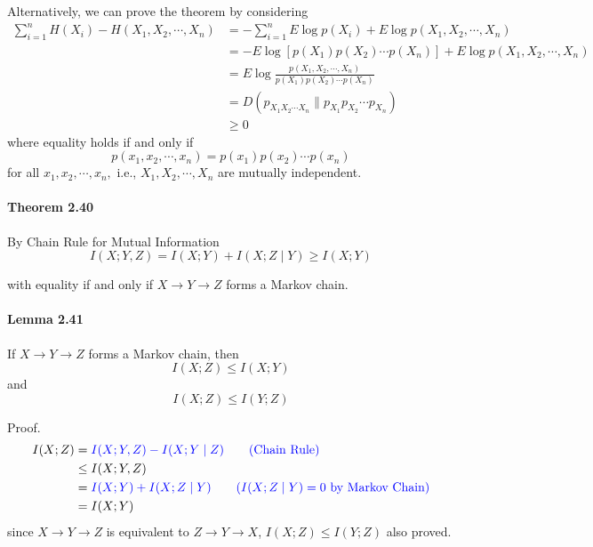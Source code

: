 \documentclass[8pt]{article}
\begin{document}
Alternatively, we can prove the theorem by considering
$$
\begin{aligned}
\sum_{i=1}^{n} H\left(X_{i}\right)-H\left(X_{1}, X_{2}, \cdots, X_{n}\right) 
&=-\sum_{i=1}^{n} E \log p\left(X_{i}\right)+E \log p\left(X_{1}, X_{2}, \cdots, X_{n}\right) \\
&=-E \log \left[p\left(X_{1}\right) p\left(X_{2}\right) \cdots p\left(X_{n}\right)\right]+E \log p\left(X_{1}, X_{2}, \cdots, X_{n}\right) \\
&=E \log \frac{p\left(X_{1}, X_{2}, \cdots, X_{n}\right)}{p\left(X_{1}\right) p\left(X_{2}\right) \cdots p\left(X_{n}\right)} \\
&=D\left(p_{X_{1} X_{2} \cdots X_{n}} \| p_{X_{1}} p_{X_{2}} \cdots p_{X_{n}}\right) \\
&\geq 0
\end{aligned}
$$
where equality holds if and only if
$$
p\left(x_{1}, x_{2}, \cdots, x_{n}\right)=p\left(x_{1}\right) p\left(x_{2}\right) \cdots p\left(x_{n}\right)
$$
for all $x_{1}, x_{2}, \cdots, x_{n},$ i.e., $X_{1}, X_{2}, \cdots, X_{n}$ are mutually independent.

\begin{tcolorbox}
\paragraph{Theorem 2.40} By Chain Rule for Mutual Information
$$
I(X ; Y, Z)=I(X ; Y)+I(X ; Z \mid Y) \geq I(X ; Y) 
$$

with equality if and only if $X \rightarrow Y \rightarrow Z$ forms a Markov chain.
\end{tcolorbox}

\begin{tcolorbox}
\paragraph{Lemma 2.41} If $X \rightarrow Y \rightarrow Z$ forms a Markov chain, then
$$
I(X ; Z) \leq I(X ; Y)
$$
and
$$
I(X ; Z) \leq I(Y ; Z)
$$
\end{tcolorbox}

Proof.
$$
\begin{aligned}
I(X ; Z) &= \color{blue} I(X ; Y, Z)-I(X ; Y \mid Z) \qquad \text{(Chain Rule)}\\
& \leq I(X ; Y, Z) \\
&= \color{blue} I(X ; Y)+I(X ; Z \mid Y)  \qquad (I(X ; Z \mid Y)=0 \text{ by Markov Chain}) \\
&=I(X ; Y)
\end{aligned}
$$
since $X \rightarrow Y \rightarrow Z$ is equivalent to $Z \rightarrow Y \rightarrow X$, $I(X ; Z) \leq I(Y ; Z)$ also proved.
\end{document}
